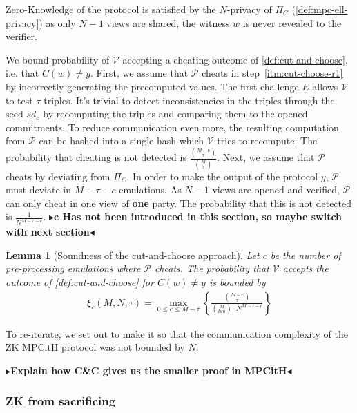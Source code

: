 \documentclass[twoside,11pt]{report}
\theoremstyle{definition}
\theoremstyle{plain}
\newtheorem{lemma}{Lemma}[section]
\newcommand{\todo}[1]{{\color[rgb]{.5,0,0}\textbf{$\blacktriangleright$#1$\blacktriangleleft$}}}
\begin{document}
Zero-Knowledge of the protocol is satisfied by the $N$-privacy of $\Pi_C$ (\autoref{def:mpc-ell-privacy}) as only $N-1$ views are shared, the witness $w$ is never revealed to the verifier.

We bound probability of $\mathcal{V}$ accepting a cheating outcome of \autoref{def:cut-and-choose}, i.e. that $C(w) \neq y$. First, we assume that $\mathcal{P}$ cheats in step~\ref{itm:cut-choose-r1} by incorrectly generating the precomputed values. The first challenge $E$ allows $\mathcal{V}$ to test $\tau$ triples. It's trivial to detect inconsistencies in the triples through the seed $sd_e$ by recomputing the triples and comparing them to the opened commitments. To reduce communication even more, the resulting computation from $\mathcal{P}$ can be hashed into a single hash which $\mathcal{V}$ tries to recompute. The probability that cheating is not detected is $\frac{\binom{M-c}{\tau}}{\binom{M}{\tau}}$. Next, we assume that $\mathcal{P}$ cheats by deviating from $\Pi_C$. In order to make the output of the protocol $y$, $\mathcal{P}$ must deviate in $M-\tau-c$ emulations. As $N-1$ views are opened and verified, $\mathcal{P}$ can only cheat in one view of \textbf{one} party. The probability that this is not detected is $\frac{1}{N^{M-\tau-c}}$. \todo{c Has not been introduced in this section, so maybe switch with next section}

\begin{lemma}[Soundness of the cut-and-choose approach]\label{lem:cut-and-choose-soundness}
  Let $c$ be the number of pre-processing emulations where $\mathcal{P}$ cheats. The probability that $\mathcal{V}$ accepts the outcome of \autoref{def:cut-and-choose} for $C(w) \neq y$ is bounded by
  \begin{align*}
    \xi_c(M, N, \tau) = \max_{0 \leq c \leq M-\tau} \left\{\frac{\binom{M-c}{\tau}}{\binom{M}{tau} \cdot N^{M-\tau-c}} \right\}
  \end{align*}
\end{lemma}

To re-iterate, we set out to make it so that the communication complexity of the ZK MPCitH protocol was not bounded by $N$.

\todo{Explain how C\&C gives us the smaller proof in MPCitH}

\subsubsection{ZK from sacrificing}\label{sec:zk-sacrifice}
\end{document}
